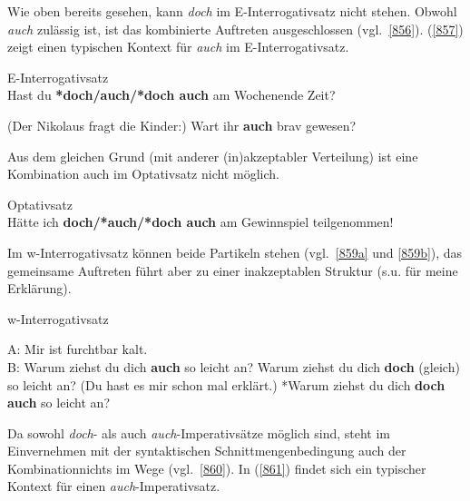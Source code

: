 {\noindent
Wie oben bereits gesehen, kann \textit{doch} im E-Interrogativsatz nicht stehen. Obwohl \textit{auch} zulässig ist, ist das kombinierte Auftreten ausgeschlossen (vgl.\ \ref{856}). (\ref{857}) zeigt einen typischen Kontext für \textit{auch} im  E-Interrogativsatz.

\begin{exe}
	\ex\label{856}E-Interrogativsatz\\
	Hast du \textbf{*doch/auch/*doch auch} am Wochenende Zeit?
\end{exe}

\begin{exe}
	\ex\label{857}
	(Der Nikolaus fragt die Kinder:) Wart ihr \textbf{auch} brav gewesen? 
	\newline
	\hbox{}\hfill\hbox{\citet[57]{Dahl1988}}
\end{exe}
Aus dem gleichen Grund (mit anderer (in)akzeptabler Verteilung) ist eine Kombination auch im Optativsatz  nicht möglich.

\begin{exe}
	\ex\label{858}Optativsatz\\
	Hätte ich \textbf{doch/*auch/*doch auch} am Gewinnspiel teilgenommen!
\end{exe}
Im w-Interrogativsatz  können beide Partikeln stehen (vgl.\ \ref{859a} und \ref{859b}), das gemeinsame Auftreten führt aber zu einer inakzeptablen Struktur (s.u. für meine Erklärung).
	
\begin{exe}
	\ex\label{859}w-Interrogativsatz\\[-1.25em]
		\begin{xlist}	
			\ex\label{859a} A: Mir ist furchtbar kalt.\\
			B: Warum ziehst du dich \textbf{auch} so leicht an?
			\hfill\hbox{\citet[89]{Helbig1990}}
			\ex\label{859b} Warum ziehst du dich \textbf{doch} (gleich) so leicht an? (Du hast es mir schon mal erklärt.)	
	 		\ex\label{859c} *Warum ziehst du dich \textbf{doch auch} so leicht an?			
		\end{xlist}
\end{exe}		
Da sowohl \textit{doch}- als auch \textit{auch}-Imperativsätze möglich sind, steht im Einverneh\-men mit der syntaktischen Schnittmengenbedingung auch der Kombination\linebreak nichts im Wege (vgl.\ \ref{860}). In (\ref{861}) findet sich ein typischer Kontext für einen \textit{auch}-Imperativsatz.

}
